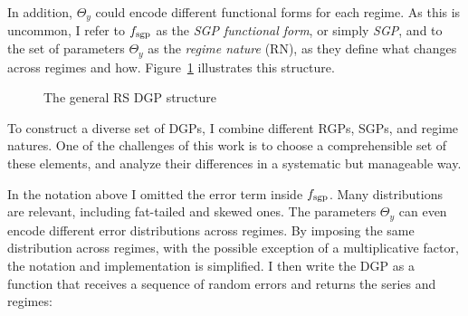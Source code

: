 \documentclass[
  letterpaper,
  DIV=11,
  numbers=noendperiod]{scrartcl}
\numberwithin{equation}{section}
\numberwithin{table}{section}
\numberwithin{figure}{section}
\begin{document}
In addition, \(\Theta_y\) could encode different functional forms for
each regime. As this is uncommon, I refer to \(f_{\text{sgp}}\) as the
\emph{SGP functional form}, or simply \emph{SGP}, and to the set of
parameters \(\Theta_y\) as the \emph{regime nature} (RN), as they define
what changes across regimes and how. Figure~\ref{fig-tik} illustrates
this structure.

\begin{figure}[H]

\caption{\label{fig-tik}The general RS DGP structure}


\end{figure}%

To construct a diverse set of DGPs, I combine different RGPs, SGPs, and
regime natures. One of the challenges of this work is to choose a
comprehensible set of these elements, and analyze their differences in a
systematic but manageable way.

In the notation above I omitted the error term inside \(f_{\text{sgp}}\). Many
distributions are relevant, including fat-tailed and skewed ones. The
parameters \(\Theta_y\) can even encode different error distributions
across regimes. By imposing the same distribution across regimes, with
the possible exception of a multiplicative factor, the notation and
implementation is simplified. I then write the DGP as a function that
receives a sequence of random errors and returns the series and regimes:
\end{document}
